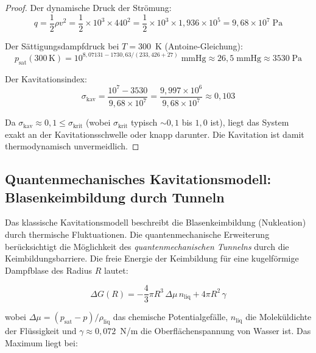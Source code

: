 ﻿\documentclass[12pt,a4paper]{report}
\begin{document}
\begin{proof}
	Der dynamische Druck der Strömung:
	\begin{equation}
		q = \frac{1}{2}\rho v^2 = \frac{1}{2}\times10^3\times440^2 = \frac{1}{2}\times10^3\times1{,}936\times10^5 = 9{,}68\times10^7\;\text{Pa}
		\label{eq:dynamischer_druck}
	\end{equation}
	
	Der Sättigungsdampfdruck bei $T = 300$~K (Antoine-Gleichung):
	\begin{equation}
		p_\mathrm{sat}(300\,\text{K}) = 10^{8{,}07131 - 1730{,}63/(233{,}426+27)}\;\text{mmHg} \approx 26{,}5\;\text{mmHg} \approx 3530\;\text{Pa}
		\label{eq:dampfdruck}
	\end{equation}
	
	Der Kavitationsindex:
	\begin{equation}
		\sigma_\mathrm{kav} = \frac{10^7 - 3530}{9{,}68\times10^7} = \frac{9{,}997\times10^6}{9{,}68\times10^7} \approx 0{,}103
		\label{eq:sigma_kav_berechnung}
	\end{equation}
	
	Da $\sigma_\mathrm{kav} \approx 0{,}1 \leq \sigma_\mathrm{krit}$ (wobei $\sigma_\mathrm{krit}$ typisch $\sim 0{,}1$ bis $1{,}0$ ist), liegt das System exakt an der Kavitationsschwelle oder knapp darunter. Die Kavitation ist damit thermodynamisch unvermeidlich.
\end{proof}

\subsection{Quantenmechanisches Kavitationsmodell: Blasenkeimbildung durch Tunneln}

Das klassische Kavitationsmodell beschreibt die Blasenkeimbildung (Nukleation) durch thermische Fluktuationen. Die quantenmechanische Erweiterung berücksichtigt die Möglichkeit des \textit{quantenmechanischen Tunnelns} durch die Keimbildungsbarriere. Die freie Energie der Keimbildung für eine kugelförmige Dampfblase des Radius $R$ lautet:

\begin{equation}
	\Delta G(R) = -\frac{4}{3}\pi R^3\,\Delta\mu\,n_\mathrm{liq} + 4\pi R^2\,\gamma
	\label{eq:free_energy_bubble}
\end{equation}

wobei $\Delta\mu = (p_\mathrm{sat} - p)/\rho_\mathrm{liq}$ das chemische Potentialgefälle, $n_\mathrm{liq}$ die Moleküldichte der Flüssigkeit und $\gamma \approx 0{,}072$~N/m die Oberflächenspannung von Wasser ist. Das Maximum liegt bei:
\end{document}
